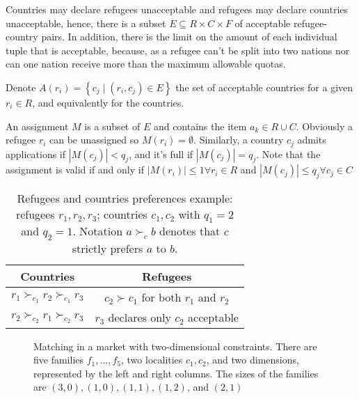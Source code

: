 \documentclass[letterpaper]{article} %
\begin{document}
    Countries may declare refugees unacceptable and refugees may declare countries unacceptable, hence, there is a subset \(E \subseteq R \times C \times F\) of acceptable refugee-country pairs.
    In addition, there is the limit on the amount of each individual tuple that is acceptable, because, as a refugee can't be split into two nations nor can one nation receive more than the maximum allowable quotas.
    
    Denote \(A \left( r_i \right) = \left\{ c_j \mid \left( r_i, c_j \right) \in E \right\}\) the set of acceptable countries for a given \(r_i \in R\), and equivalently for the countries.
    
    An assignment \(M\) is a subset of \(E\) and contains the item \(a_k \in R \cup C\).
    Obviously a refugee \(r_i\) can be unassigned so \(M \left( r_i \right) = \emptyset\).
    Similarly, a country \(c_j\) admits applications if \(\left| M \left( c_j \right) \right| < q_j\), and it's full if \(\left| M \left( c_j \right) \right| = q_j\).
    Note that the assignment is valid if and only if \(\left| M \left( r_i \right) \right| \leq 1 \forall r_i \in R\) and \(\left| M \left( c_j \right) \right| \leq q_j \forall c_j \in C\)

    \begin{table}[!htb]
        \begin{tabular}{c|c}
            \hline Countries & Refugees \\
            \hline \(r_1 \succ_{c_1} r_2 \succ_{c_1} r_3\) & \(c_2 \succ c_1\) for both \(r_1\) and \(r_2\) \\
            \(r_2 \succ_{c_2} r_1 \succ_{c_2} r_3\) & \(r_3\) declares only \(c_2\) acceptable \\
            \hline
        \end{tabular}
        \caption{Refugees and countries preferences example: refugees \(r_1, r_2, r_3\); countries \(c_1, c_2\) with \(q_1 = 2\) and \(q_2 = 1\). Notation \(a \succ_c b\) denotes that \(c\) strictly prefers \(a\) to \(b\).}
        \label{tab:countries-refugees}
    \end{table}

    \begin{figure}[!htb] %
        \def\svgwidth{\columnwidth}
        
        \caption{Matching in a market with two-dimensional constraints. There are five families
            \(f_1, \dots, f_5\), two localities \(c_1, c_2\), and two dimensions, represented by the left and right columns.
            The sizes of the families are \((3, 0), (1, 0), (1, 1), (1, 2)\), and \((2, 1)\)}
        \label{fig:complete_matching}
    \end{figure}
\end{document}
